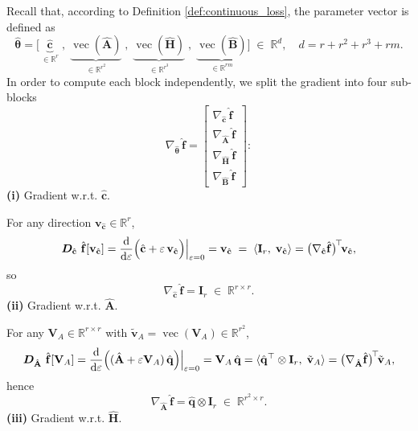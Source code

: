 Recall that, according to Definition \ref{def:continuous_loss}, the parameter vector is defined as\\
$$\hat{\bm{\theta}}=\bigl[\,\underbrace{\hat{\mathbf{c}}}_{\in\mathbb{R}^r}\;,\;\underbrace{\operatorname{vec}(\hat{\mathbf{A}})}_{\in\mathbb{R}^{r^2}}\;,\;\underbrace{\operatorname{vec}(\hat{\mathbf{H}})}_{\in\mathbb{R}^{r^3}}\;,\;\underbrace{\operatorname{vec}(\hat{\mathbf{B}})}_{\in\mathbb{R}^{rm}}\bigr]\;\in\; \mathbb{R}^d,\quad d = r + r^2 + r^3 + rm.$$
In order to compute each block independently, we split the gradient into four sub-blocks\\
$$\nabla_{\hat{\bm{\theta}}}\,\hat{\mathbf{f}} = \begin{bmatrix}
\nabla_{\hat{\mathbf{c}}}\,\hat{\mathbf{f}} \\
\nabla_{\hat{\mathbf{A}}}\,\hat{\mathbf{f}} \\
\nabla_{\hat{\mathbf{H}}}\,\hat{\mathbf{f}} \\
\nabla_{\hat{\mathbf{B}}}\,\hat{\mathbf{f}} 
\end{bmatrix}:$$
\noindent\textbf{(i)} Gradient w.r.t. $\hat{\mathbf{c}}$.

For any direction \(\mathbf{v}_{\hat{\mathbf{c}}}\in\mathbb{R}^r\),\\
$$\bm{D}_{\hat{\mathbf{c}}}~\hat{\mathbf{f}}[\mathbf{v}_{\hat{\mathbf{c}}}] = \dv{}{\varepsilon}\Bigl(\hat{\mathbf{c}}+\varepsilon\,\mathbf{v}_{\hat{\mathbf{c}}}\Bigr)\Big|_{\varepsilon=0} = \mathbf{v}_{\hat{\mathbf{c}}}\;=\;\langle \mathbf{I}_r,\;\mathbf{v}_{\hat{\mathbf{c}}}\rangle = \bigl(\nabla_{\hat{\mathbf{c}}}\hat{\mathbf{f}}\bigr)^{\!\top}\!\mathbf{v}_{\hat{\mathbf{c}}},$$
so\\
$$\nabla_{\hat{\mathbf{c}}}\,\hat{\mathbf{f}}=\mathbf{I}_r\;\in\;\mathbb{R}^{r\times r}.$$
\noindent\textbf{(ii)} Gradient w.r.t. $\hat{\mathbf{A}}$.

For any $\mathbf{V}_A\in\mathbb{R}^{r\times r}$ with $\tilde{\mathbf{v}}_A=\operatorname{vec}(\mathbf{V}_A)\in\mathbb{R}^{r^2}$,\\
$$\bm{D}_{\hat{\mathbf{A}}}~\hat{\mathbf{f}}[\mathbf{V}_A] = \dv{}{\varepsilon}\Bigl((\hat{\mathbf{A}}+\varepsilon\mathbf{V}_A)\,\hat{\mathbf{q}}\Bigr)\Big|_{\varepsilon=0}=\mathbf{V}_A\,\hat{\mathbf{q}}=\langle\hat{\mathbf{q}}^{\top}\otimes\mathbf{I}_r,\;\tilde{\mathbf{v}}_A\rangle=\bigl(\nabla_{\hat{\mathbf{A}}}\hat{\mathbf{f}}\bigr)^{\!\top}\!\tilde{\mathbf{v}}_A,$$
hence\\
$$\nabla_{\hat{\mathbf{A}}}\,\hat{\mathbf{f}}=\hat{\mathbf{q}}\otimes\mathbf{I}_r\;\in\;\mathbb{R}^{r^2\times r}.$$
\noindent\textbf{(iii)} Gradient w.r.t. $\hat{\mathbf{H}}$.

